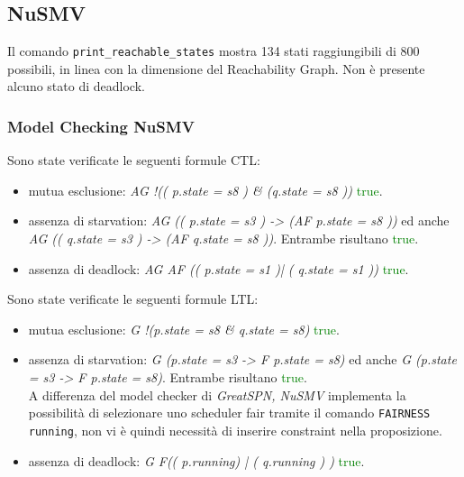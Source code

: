 \documentclass[a4paper]{article}
\begin{document}
\subsection{NuSMV}

Il comando \texttt{print\_reachable\_states} mostra 134 stati raggiungibili di 800 possibili, in linea con la dimensione del Reachability Graph.
Non è presente alcuno stato di deadlock.\\

\subsubsection{Model Checking NuSMV}
Sono state verificate le seguenti formule CTL:
\begin{itemize}
        \item mutua esclusione: \textit{AG !(( p.state = s8 ) \& (q.state = s8 ))} \textcolor{green}{true}.
        \item assenza di starvation: \textit{AG (( p.state = s3 ) -> (AF p.state = s8 ))} ed anche \textit{AG (( q.state = s3 ) -> (AF q.state = s8 ))}. Entrambe risultano \textcolor{green}{true}.\\
        \item assenza di deadlock: \textit{AG AF (( p.state = s1 )| ( q.state = s1 ))} \textcolor{green}{true}.\\
\end{itemize}
Sono state verificate le seguenti formule LTL:
\begin{itemize}
        \item mutua esclusione: \textit{G !(p.state = s8 \& q.state = s8)} \textcolor{green}{true}.\\
        \item assenza di starvation: \textit{G (p.state = s3 ->  F p.state = s8)} ed anche \textit{G (p.state = s3 ->  F p.state = s8)}. Entrambe risultano \textcolor{green}{true}.\\
		A differenza del model checker di \textit{GreatSPN, NuSMV} implementa la possibilità di selezionare uno scheduler fair tramite il comando \texttt{FAIRNESS running}, non vi è quindi necessità di inserire constraint nella proposizione.
        \item assenza di deadlock: \textit{G F(( p.running) | ( q.running ) )} \textcolor{green}{true}. \\
\end{itemize}
\end{document}
